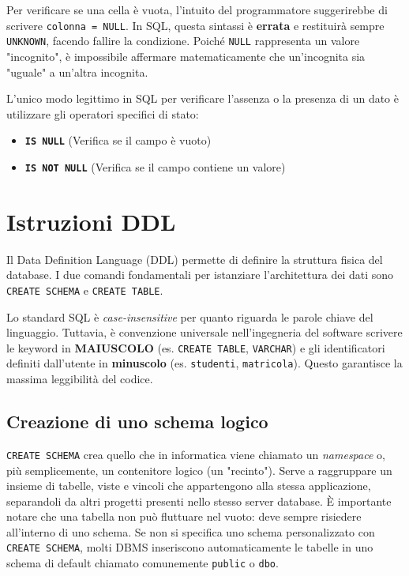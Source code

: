 \begin{warningbox}[La trappola del NULL: IS NULL vs = NULL]
Per verificare se una cella è vuota, l'intuito del programmatore suggerirebbe di scrivere \texttt{colonna = NULL}. In SQL, questa sintassi è \textbf{errata} e restituirà sempre \texttt{UNKNOWN}, facendo fallire la condizione. Poiché \texttt{NULL} rappresenta un valore "incognito", è impossibile affermare matematicamente che un'incognita sia "uguale" a un'altra incognita. 

L'unico modo legittimo in SQL per verificare l'assenza o la presenza di un dato è utilizzare gli operatori specifici di stato:
\begin{itemize}
    \item \texttt{\textbf{IS NULL}} (Verifica se il campo è vuoto)
    \item \texttt{\textbf{IS NOT NULL}} (Verifica se il campo contiene un valore)
\end{itemize}
\end{warningbox}

\section{Istruzioni DDL}

Il Data Definition Language (DDL) permette di definire la struttura fisica del database. I due comandi fondamentali per istanziare l'architettura dei dati sono \texttt{CREATE SCHEMA} e \texttt{CREATE TABLE}.

\begin{bestpractice}
Lo standard SQL è \textit{case-insensitive} per quanto riguarda le parole chiave del linguaggio. Tuttavia, è convenzione universale nell'ingegneria del software scrivere le keyword in \textbf{MAIUSCOLO} (es. \texttt{CREATE TABLE}, \texttt{VARCHAR}) e gli identificatori definiti dall'utente in \textbf{minuscolo} (es. \texttt{studenti}, \texttt{matricola}). Questo garantisce la massima leggibilità del codice.
\end{bestpractice}

\subsection{Creazione di uno schema logico}
\texttt{CREATE SCHEMA} crea quello che in informatica viene chiamato un \textit{namespace} o, più semplicemente, un contenitore logico (un "recinto"). Serve a raggruppare un insieme di tabelle, viste e vincoli che appartengono alla stessa applicazione, separandoli da altri progetti presenti nello stesso server database. È importante notare che una tabella non può fluttuare nel vuoto: deve sempre risiedere all'interno di uno schema. Se non si specifica uno schema personalizzato con \texttt{CREATE SCHEMA}, molti DBMS inseriscono automaticamente le tabelle in uno schema di default chiamato comunemente \texttt{public} o \texttt{dbo}.

